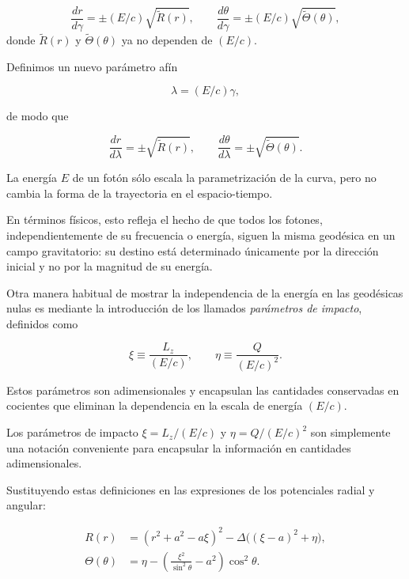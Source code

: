 \begin{equation}
\frac{dr}{d\gamma} = \pm (E/c) \sqrt{\tilde{R}(r)}, \qquad
\frac{d\theta}{d\gamma} = \pm (E/c) \sqrt{\tilde{\Theta}(\theta)},
\end{equation}
donde \(\tilde{R}(r)\) y \(\tilde{\Theta}(\theta)\) ya no dependen de \((E/c)\).

Definimos un nuevo parámetro afín

\begin{equation}
\lambda = (E/c)\gamma,
\end{equation}

de modo que

\begin{equation}
\frac{dr}{d\lambda} = \pm \sqrt{\tilde{R}(r)}, \qquad
\frac{d\theta}{d\lambda} = \pm \sqrt{\tilde{\Theta}(\theta)}.
\end{equation}

La energía \(E\) de un fotón sólo escala la parametrización de la curva, 
pero no cambia la forma de la trayectoria en el espacio-tiempo. 

En términos físicos, esto refleja el hecho de que todos los fotones, independientemente  de su frecuencia o energía, siguen la misma geodésica en un campo gravitatorio: 
su destino está determinado únicamente por la dirección inicial y no por la magnitud de su energía.


Otra manera habitual de mostrar la independencia de la energía en las geodésicas nulas es mediante la introducción de los llamados \emph{parámetros de impacto}, definidos como

\begin{equation}
\xi \equiv \frac{L_z}{(E/c)}, \qquad \eta \equiv \frac{Q}{(E/c)^2}.
\end{equation}

Estos parámetros son adimensionales y encapsulan las cantidades conservadas en cocientes 
que eliminan la dependencia en la escala de energía \((E/c)\). 


Los parámetros de impacto \(\xi=L_z/(E/c)\) y \(\eta=Q/(E/c)^2\) son simplemente 
una notación conveniente para encapsular la información en cantidades adimensionales.

Sustituyendo estas definiciones en las expresiones de los potenciales radial y angular:

\begin{align}
R(r) &=  (r^2+a^2 - a\xi)^2 - \Delta\big((\xi - a)^2 + \eta \big) , \\
\Theta(\theta)  &=  \eta - \left( \frac{\xi^2}{\sin^2\theta} - a^2 \right)\cos^2\theta .
\end{align}

